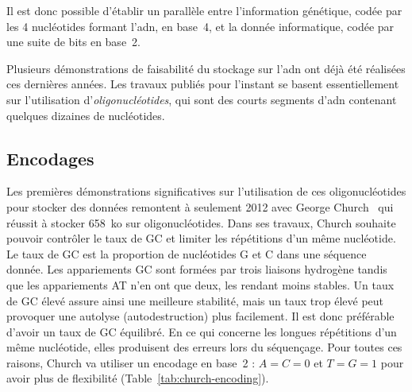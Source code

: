 \documentclass[a4paper]{report}
\begin{document}
Il est donc possible d'établir un parallèle entre l'information génétique, codée par les 4 nucléotides formant l'\ac{adn}, en base~4, et la donnée informatique, codée par une suite de bits en base~2.

Plusieurs démonstrations de faisabilité du stockage sur l’\ac{adn} ont déjà été réalisées ces dernières années.
Les travaux publiés pour l’instant se basent essentiellement sur l’utilisation d’\emph{oligonucléotides}, qui sont des courts segments d’\ac{adn} contenant quelques dizaines de nucléotides.

\subsection{Encodages}

Les premières démonstrations significatives sur l’utilisation de ces oligonucléotides pour stocker des données remontent à seulement 2012 avec George Church~\cite{church2012next} qui réussit à stocker 658~ko sur  oligonucléotides.
Dans ses travaux, Church souhaite pouvoir contrôler le taux de GC et limiter les répétitions d’un même nucléotide.
Le taux de GC est la proportion de nucléotides G et C dans une séquence donnée. 
Les appariements GC sont formées par trois liaisons hydrogène tandis que les appariements AT n'en ont que deux, les rendant moins stables.
Un taux de GC élevé assure ainsi une meilleure stabilité, mais un taux trop élevé peut provoquer une autolyse (autodestruction) plus facilement.
Il est donc préférable d’avoir un taux de GC équilibré.
En ce qui concerne les longues répétitions d’un même nucléotide, elles produisent des erreurs lors du séquençage.
Pour toutes ces raisons, Church va utiliser un encodage en base~2 : $A=C=0$ et $T=G=1$ pour avoir plus de flexibilité (Table~\ref{tab:church-encoding}).
\end{document}
